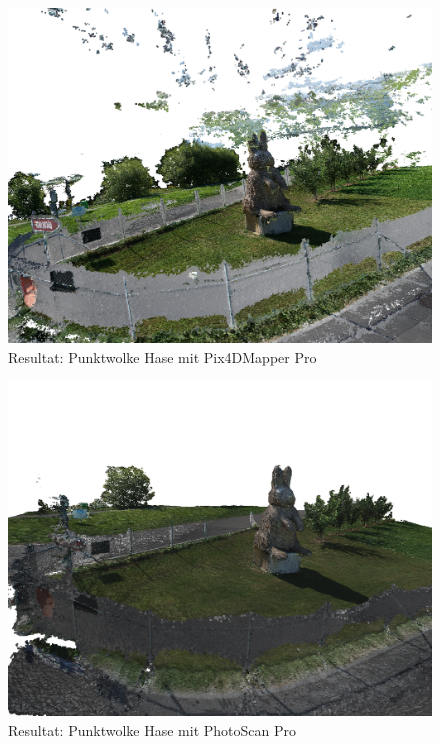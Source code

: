 \begin{figure}[p]
	\centerline{
		\includegraphics[width=20cm,angle=90]{images/rabbit-dense-pix4d.png}
	}
	\caption{Resultat: Punktwolke Hase mit Pix4DMapper Pro}
	\label{img:rabbit-dense-pix4d}
\end{figure}

\begin{figure}[p]
	\centerline{
		\includegraphics[width=20cm,angle=90]{images/rabbit-dense-photoscan.png}
	}
	\caption{Resultat: Punktwolke Hase mit PhotoScan Pro}
	\label{img:rabbit-dense-photoscan}
\end{figure}

